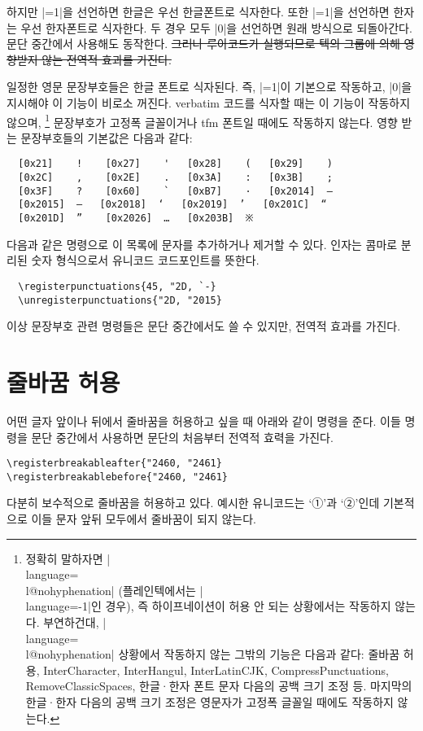 \documentclass[a4paper]{article}
\def\luatex{\hologo{LuaTeX}}
\def\logoko{\textsf{k}\kern-.0625em\textit{o}}
\def\luatexko{\luatex-\logoko}
\begin{document}
하지만 \pkgkwd{\hangulbyhangulfont}|=1|을 선언하면 한글은 우선 한글폰트로
식자한다. 또한 \pkgkwd{\hanjabyhanjafont}|=1|을 선언하면 한자는 우선 한자폰트로
식자한다. 두 경우 모두 |0|을 선언하면 원래 방식으로 되돌아간다.
문단 중간에서 사용해도 동작한다. \sout{그러나 루아코드가 실행되므로
텍의 그룹에 의해 영향받지 않는 전역적 효과를 가진다.}

일정한 영문 문장부호들은 한글 폰트로 식자된다.
즉, \pkgkwd{\hangulpunctuations}|=1|이 기본으로 작동하고,
|0|을 지시해야 이 기능이 비로소 꺼진다.
verbatim 코드를 식자할 때는 이 기능이 작동하지 않으며,%
\footnote{%
  정확히 말하자면 |\\language=\\l@nohyphenation| (플레인텍에서는 |\\language=-1|인 경우),
  즉 하이프네이션이 허용 안 되는  상황에서는 작동하지 않는다.
  부연하건대, |\\language=\\l@nohyphenation| 상황에서 작동하지 않는
  그밖의 기능은 다음과 같다: 줄바꿈 허용, InterCharacter, InterHangul,
  InterLatinCJK, CompressPunctuations, RemoveClassicSpaces,
  한글^^b7한자 폰트 문자 다음의 공백 크기 조정 등. 마지막의
  한글^^b7한자 다음의 공백 크기 조정은 영문자가 고정폭 글꼴일 때에도
  작동하지 않는다. }
문장부호가 고정폭 글꼴이거나 tfm 폰트일 때에도 작동하지 않는다.
영향 받는 문장부호들의 기본값은 다음과 같다:
\begin{verbatim}
  [0x21]    !    [0x27]    '   [0x28]    (   [0x29]    )
  [0x2C]    ,    [0x2E]    .   [0x3A]    :   [0x3B]    ;
  [0x3F]    ?    [0x60]    `   [0xB7]    ·   [0x2014]  —
  [0x2015]  ―   [0x2018]  ‘   [0x2019]  ’   [0x201C]  “
  [0x201D]  ”    [0x2026]  …   [0x203B]  ※
\end{verbatim}
다음과 같은 명령으로 이 목록에 문자를 추가하거나 제거할 수 있다.%
\pkgkwd*{\registerpunctuations}%
\pkgkwd*{\unregisterpunctuations}
인자는 콤마로 분리된 숫자 형식으로서 유니코드 코드포인트를 뜻한다.
\begin{verbatim}
  \registerpunctuations{45, "2D, `-}
  \unregisterpunctuations{"2D, "2015}
\end{verbatim}
이상 문장부호 관련 명령들은 문단 중간에서도 쓸 수 있지만, 전역적 효과를 가진다.

\section{줄바꿈 허용}\label{sec:break}

어떤 글자 앞이나 뒤에서 줄바꿈을 허용하고 싶을 때 아래와 같이 명령을 준다.%
\pkgkwd*{\registerbreakableafter}%
\pkgkwd*{\registerbreakablebefore}
이들 명령을 문단 중간에서 사용하면 문단의 처음부터 전역적 효력을 가진다.
\begin{verbatim}
\registerbreakableafter{"2460, "2461}
\registerbreakablebefore{"2460, "2461}
\end{verbatim}
 다분히 보수적으로 줄바꿈을 허용하고 있다.
예시한 유니코드는 `①'과 `②'인데 기본적으로
이들 문자 앞뒤 모두에서 줄바꿈이 되지 않는다.
\end{document}
